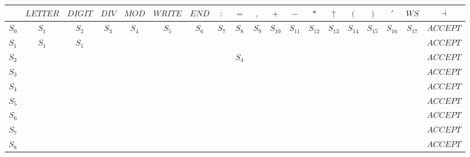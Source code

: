\documentclass[a4paper,12pt]{article}
\begin{document}
\begin{landscape}

\begin{tabular}{|c|c|c|c|c|c|c|c|c|c|c|c|c|c|c|c|c|c|c|}
\hline
			&	$LETTER$	&	$DIGIT$	&	$DIV$		&	$MOD$		&	$WRITE$	&	$END$		&	$:$		&	$=$		&	$,$		&	$+$		&	$-$			&	$*$		&	$\uparrow$		&	$($		&	$)$		&	$'$		&	$WS$		&	$\dashv$	\\
\hline                                                                           
$S_{0}$	&	$S_{1}$	&	$S_{2}$	&	$S_{3}$	&	$S_{4}$	&	$S_{5}$	&	$S_{6}$	&	$S_{7}$	&	$S_{8}$	&	$S_{9}$	&	$S_{10}$	&	$S_{11}$	&	$S_{12}$	&	$S_{13}$	&	$S_{14}$	&	$S_{15}$	&	$S_{16}$	&	$S_{17}$	&	$ACCEPT$	\\
\hline                                                                           
$S_{1}$	&	$S_{1}$	&	$S_{1}$	&				&				&				&				&				&				&				&				&				&				&				&				&				&				&				&	$ACCEPT$	\\
\hline                                                                           
$S_{2}$	&				&				&				&				&				&				&				&	$S_{4}$	&				&				&				&				&				&				&				&				&				&	$ACCEPT$	\\
\hline                                                                           
$S_{3}$	&				&				&				&				&				&				&				&				&				&				&				&				&				&				&				&				&				&	$ACCEPT$	\\
\hline                                                                           
$S_{4}$	&				&				&				&				&				&				&				&				&				&				&				&				&				&				&				&				&				&	$ACCEPT$	\\
\hline                                                                           
$S_{5}$	&				&				&				&				&				&				&				&				&				&				&				&				&				&				&				&				&				&	$ACCEPT$	\\
\hline                                                                           
$S_{6}$	&				&				&				&				&				&				&				&				&				&				&				&				&				&				&				&				&				&	$ACCEPT$	\\
\hline                                                                           
$S_{7}$	&				&				&				&				&				&				&				&				&				&				&				&				&				&				&				&				&				&	$ACCEPT$	\\
\hline                                                                           
$S_{8}$	&				&				&				&				&				&				&				&				&				&				&				&				&				&				&				&				&				&	$ACCEPT$	\\
\hline                                                                           

\end{tabular}
\end{landscape}
\end{document}
